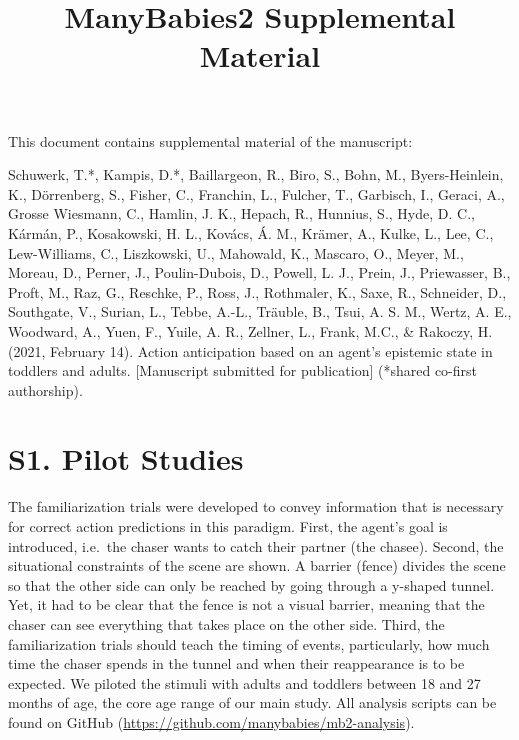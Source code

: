 \documentclass[
  man, donotrepeattitle,floatsintext]{apa6}
\title{ManyBabies2 Supplemental Material}
\author{\phantom{0}}
\date{}
\affiliation{\phantom{0}}
\begin{document}
\maketitle

\setcounter{table}{0}  \renewcommand{\thetable}{S\arabic{table}} \setcounter{figure}{0} \renewcommand{\thefigure}{S\arabic{figure}}

This document contains supplemental material of the manuscript:

Schuwerk, T.*, Kampis, D.*, Baillargeon, R., Biro, S., Bohn, M., Byers-Heinlein, K., Dörrenberg, S., Fisher, C., Franchin, L., Fulcher, T., Garbisch, I., Geraci, A., Grosse Wiesmann, C., Hamlin, J. K., Hepach, R., Hunnius, S., Hyde, D. C., Kármán, P., Kosakowski, H. L., Kovács, Á. M., Krämer, A., Kulke, L., Lee, C., Lew-Williams, C., Liszkowski, U., Mahowald, K., Mascaro, O., Meyer, M., Moreau, D., Perner, J., Poulin-Dubois, D., Powell, L. J., Prein, J., Priewasser, B., Proft, M., Raz, G., Reschke, P., Ross, J., Rothmaler, K., Saxe, R., Schneider, D., Southgate, V., Surian, L., Tebbe, A.-L., Träuble, B., Tsui, A. S. M., Wertz, A. E., Woodward, A., Yuen, F., Yuile, A. R., Zellner, L., Frank, M.C., \& Rakoczy, H. (2021, February 14). Action anticipation based on an agent's epistemic state in toddlers and adults. {[}Manuscript submitted for publication{]} (*shared co-first authorship).

\section{S1. Pilot Studies}\label{s1.-pilot-studies}

The familiarization trials were developed to convey information that is necessary for correct action predictions in this paradigm. First, the agent's goal is introduced, i.e.~the chaser wants to catch their partner (the chasee). Second, the situational constraints of the scene are shown. A barrier (fence) divides the scene so that the other side can only be reached by going through a y-shaped tunnel. Yet, it had to be clear that the fence is not a visual barrier, meaning that the chaser can see everything that takes place on the other side. Third, the familiarization trials should teach the timing of events, particularly, how much time the chaser spends in the tunnel and when their reappearance is to be expected. We piloted the stimuli with adults and toddlers between 18 and 27 months of age, the core age range of our main study. All analysis scripts can be found on GitHub (\url{https://github.com/manybabies/mb2-analysis}).
\end{document}
